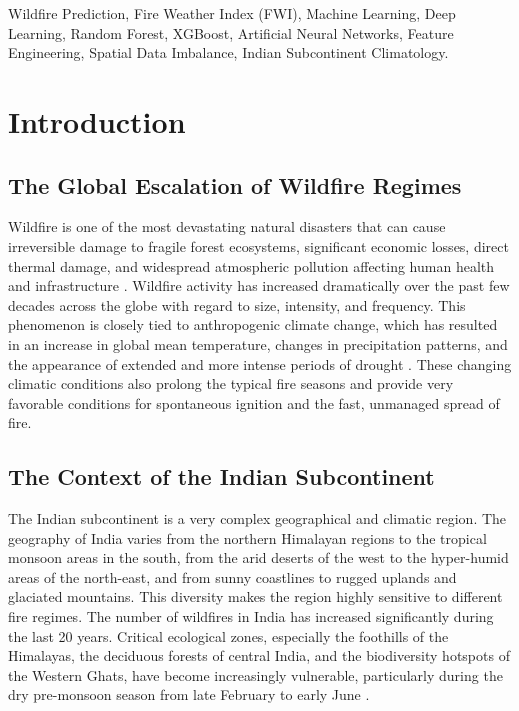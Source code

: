 \documentclass[journal, 10pt, twocolumn]{IEEEtran}
\begin{document}
\begin{IEEEkeywords}
Wildfire Prediction, Fire Weather Index (FWI), Machine Learning, Deep Learning, Random Forest, XGBoost, Artificial Neural Networks, Feature Engineering, Spatial Data Imbalance, Indian Subcontinent Climatology.
\end{IEEEkeywords}

\section{Introduction}

\subsection{The Global Escalation of Wildfire Regimes}
Wildfire is one of the most devastating natural disasters that can cause irreversible damage to fragile forest ecosystems, significant economic losses, direct thermal damage, and widespread atmospheric pollution affecting human health and infrastructure \cite{b1}. Wildfire activity has increased dramatically over the past few decades across the globe with regard to size, intensity, and frequency. This phenomenon is closely tied to anthropogenic climate change, which has resulted in an increase in global mean temperature, changes in precipitation patterns, and the appearance of extended and more intense periods of drought \cite{b2}. These changing climatic conditions also prolong the typical fire seasons and provide very favorable conditions for spontaneous ignition and the fast, unmanaged spread of fire.

\subsection{The Context of the Indian Subcontinent}
The Indian subcontinent is a very complex geographical and climatic region. The geography of India varies from the northern Himalayan regions to the tropical monsoon areas in the south, from the arid deserts of the west to the hyper-humid areas of the north-east, and from sunny coastlines to rugged uplands and glaciated mountains. This diversity makes the region highly sensitive to different fire regimes. The number of wildfires in India has increased significantly during the last 20 years. Critical ecological zones, especially the foothills of the Himalayas, the deciduous forests of central India, and the biodiversity hotspots of the Western Ghats, have become increasingly vulnerable, particularly during the dry pre-monsoon season from late February to early June \cite{b4}.
\end{document}
